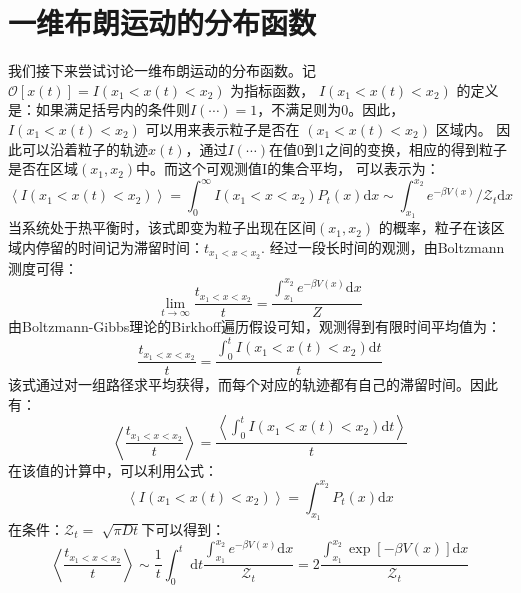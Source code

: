

\section{一维布朗运动的分布函数}
我们接下来尝试讨论一维布朗运动的分布函数。记
$\mathcal{O}[x(t)]=I\left(x_{1}<x(t)<x_{2}\right)$  为指标函数，  $I\left(x_{1}<x(t)<x_{2}\right)$ 的定义是：如果满足括号内的条件则$I(\cdots)=1$，不满足则为0。因此， $I\left(x_ {1}<x(t)<x_{2}\right)$  可以用来表示粒子是否在  $\left(x_{1}<x(t)<x_{2}\right)$  区域内。
因此可以沿着粒子的轨迹$x(t)$，通过$I(\cdots)$在值0到1之间的变换，相应的得到粒子是否在区域$\left(x_{1}, x_{2}\right)$中。而这个可观测值I的集合平均，
可以表示为：
\begin{equation}
\left\langle I\left(x_{1}<x(t)<x_{2}\right)\right\rangle=\int_{0}^{\infty} I\left(x_{1}<x<x_{2}\right) P_{t}(x) \mathrm{d} x \sim \int_{x_{1}}^{x_{2}} e^{-\beta V(x)} / \mathcal{Z}_{t}\mathrm{d}x
\end{equation}
当系统处于热平衡时，该式即变为粒子出现在区间$\left(x_{1}, x_{2}\right)$ 的概率，粒子在该区域内停留的时间记为滞留时间：$t_{x_{1}<x<x_{2}}$.  
经过一段长时间的观测，由Boltzmann测度可得：
\begin{equation}
\lim _{t \rightarrow \infty}\frac{t_{x_{1}<x<x_{2}}}{ t}=\frac{\int_{x_{1}}^{x_{2}} e^{-\beta V(x)} \mathrm{d} x}{Z}
\end{equation}
由Boltzmann-Gibbs理论的Birkhoff遍历假设可知，观测得到有限时间平均值为：
\begin{equation}
\frac{t_{x_{1}<x<x_{2}}}{t}=\frac{\int_{0}^{t} I\left(x_{1}<x(t)<x_{2}\right) \mathrm{d} t}{t}
\end{equation}
该式通过对一组路径求平均获得，而每个对应的轨迹都有自己的滞留时间。因此有：\begin{equation}
\left\langle\frac{t_{x_{1}<x<x_{2}}}{t}\right\rangle=\frac{\left\langle\int_{0}^{t} I\left(x_{1}<x(t)<x_{2}\right) \mathrm{d} t\right\rangle}{t}
\end{equation}
在该值的计算中，可以利用公式：
\begin{equation}
\left\langle I\left(x_{1}<x(t)<x_{2}\right)\right\rangle=\int_{x_{1}}^{x_{2}} P_{t}(x) \mathrm{d} x
\end{equation}
在条件：$\mathcal{Z}_{t}=$ $\sqrt{\pi D t}$下可以得到：
\begin{equation}
\left\langle\frac{t_{x_{1}<x<x_{2}}}{t}\right\rangle \sim \frac{1}{t} \int_{0}^{t} \mathrm{~d} t \frac{\int_{x_{1}}^{x_{2}} e^{-\beta V(x)} \mathrm{d} x}{\mathcal{Z}_{t}}=
2 \frac{\int_{x_{1}}^{x_{2}} \exp [-\beta V(x)] \mathrm{d} x}{\mathcal{Z}_{t}}
\end{equation}

